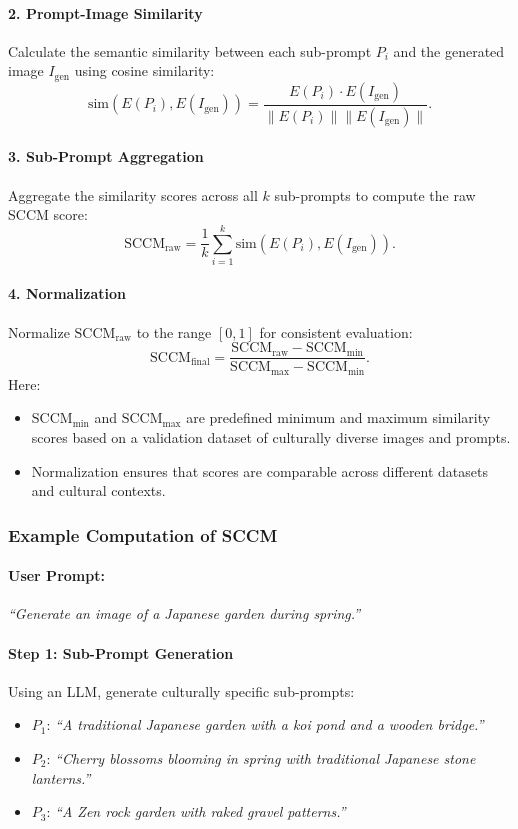 \paragraph{2. Prompt-Image Similarity}
Calculate the semantic similarity between each sub-prompt \(P_i\) and the generated image \(I_{\text{gen}}\) using cosine similarity:
\[
\text{sim}(E(P_i), E(I_{\text{gen}})) = \frac{E(P_i) \cdot E(I_{\text{gen}})}{\|E(P_i)\| \|E(I_{\text{gen}})\|}.
\]

\paragraph{3. Sub-Prompt Aggregation}
Aggregate the similarity scores across all \(k\) sub-prompts to compute the raw SCCM score:
\[
\text{SCCM}_{\text{raw}} = \frac{1}{k} \sum_{i=1}^k \text{sim}(E(P_i), E(I_{\text{gen}})).
\]

\paragraph{4. Normalization}
Normalize \(\text{SCCM}_{\text{raw}}\) to the range \([0, 1]\) for consistent evaluation:
\[
\text{SCCM}_{\text{final}} = \frac{\text{SCCM}_{\text{raw}} - \text{SCCM}_{\text{min}}}{\text{SCCM}_{\text{max}} - \text{SCCM}_{\text{min}}}.
\]
Here:
\begin{itemize}
    \item \(\text{SCCM}_{\text{min}}\) and \(\text{SCCM}_{\text{max}}\) are predefined minimum and maximum similarity scores based on a validation dataset of culturally diverse images and prompts.
    \item Normalization ensures that scores are comparable across different datasets and cultural contexts.
\end{itemize}



\subsubsection{Example Computation of SCCM}
\paragraph{User Prompt:}
\emph{“Generate an image of a Japanese garden during spring.”}

\paragraph{Step 1: Sub-Prompt Generation}
Using an LLM, generate culturally specific sub-prompts:
\begin{itemize}
    \item \(P_1\): \emph{“A traditional Japanese garden with a koi pond and a wooden bridge.”}
    \item \(P_2\): \emph{“Cherry blossoms blooming in spring with traditional Japanese stone lanterns.”}
    \item \(P_3\): \emph{“A Zen rock garden with raked gravel patterns.”}
\end{itemize}

